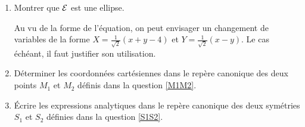 \documentclass[a4paper,12pt,reqno]{amsart}
\begin{document}
\begin{exo}
  \begin{enumerate}[resume]
    \item Montrer que $\mathcal{E}$ est une ellipse.\\
    \begin{indication}
      Au vu de la forme de l'équation, on peut envisager un changement de variables de la forme $X=\frac{1}{\sqrt{2}}(x+y-4)$ et $Y=\frac{1}{\sqrt{2}}(x-y)$. Le cas échéant, il faut justifier son utilisation.
    \end{indication}
    \item Déterminer les coordonnées cartésiennes dans le repère canonique des deux points $M_{1}$ et $M_{2}$ définis dans la question \eqref{M1M2}.\\
    \item Écrire les expressions analytiques dans le repère canonique des deux symétries $S_{1}$ et $S_{2}$ définies dans la question \eqref{S1S2}.
  \end{enumerate}

\end{exo}
\end{document}
